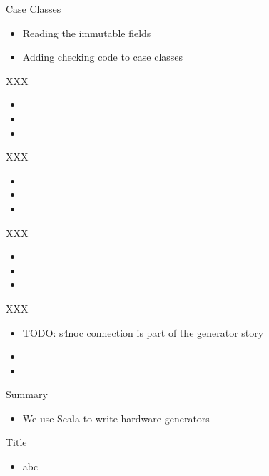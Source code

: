 \begin{frame}[fragile]{Case Classes}
\begin{itemize}
\item Reading the immutable fields
\item Adding checking code to case classes
\end{itemize}
\end{frame}

\begin{frame}[fragile]{XXX}
\begin{itemize}
\item
\item
\item
\end{itemize}
\end{frame}
\begin{frame}[fragile]{XXX}
\begin{itemize}
\item
\item
\item
\end{itemize}
\end{frame}




\begin{frame}[fragile]{XXX}
\begin{itemize}
\item
\item
\item
\end{itemize}
\end{frame}



\begin{frame}[fragile]{XXX}
\begin{itemize}
\item TODO: s4noc connection is part of the generator story
\item
\item
\end{itemize}
\end{frame}


\begin{frame}[fragile]{Summary}
\begin{itemize}
\item We use Scala to write hardware generators
\end{itemize}
\end{frame}




\begin{frame}[fragile]{Title}
\begin{itemize}
\item abc
\end{itemize}
\end{frame}
